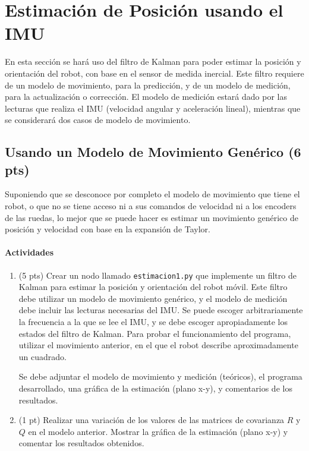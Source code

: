 \documentclass[a4paper,11pt]{robotlabs}
\begin{document}
\section{Estimación de Posición usando el IMU}

En esta sección se hará uso del filtro de Kalman para poder estimar la posición
y orientación del robot, con base en el sensor de medida inercial. Este filtro
requiere de un modelo de movimiento, para la predicción, y de un modelo de
medición, para la actualización o corrección. El modelo de medición estará dado
por las lecturas que realiza el IMU (velocidad angular y aceleración lineal),
mientras que se considerará dos casos de modelo de movimiento.

\subsection{Usando un Modelo de Movimiento Genérico (6 pts)}

Suponiendo que se desconoce por completo el modelo de movimiento que tiene el
robot, o que no se tiene acceso ni a sus comandos de velocidad ni a los
encoders de las ruedas, lo mejor que se puede hacer es estimar un movimiento
genérico de posición y velocidad con base en la expansión de Taylor.

\paragraph{Actividades} 

\begin{enumerate}
\item (5 pts) Crear un nodo llamado \texttt{estimacion1.py} que implemente un
  filtro de Kalman para estimar la posición y orientación del robot móvil. Este
  filtro debe utilizar un modelo de movimiento genérico, y el modelo de
  medición debe incluir las lecturas necesarias del IMU. Se puede escoger
  arbitrariamente la frecuencia a la que se lee el IMU, y se debe escoger
  apropiadamente los estados del filtro de Kalman. Para probar el
  funcionamiento del programa, utilizar el movimiento anterior, en el que el
  robot describe aproximadamente un cuadrado.

  Se debe adjuntar el modelo de movimiento y medición (teóricos), el programa
  desarrollado, una gráfica de la estimación (plano x-y), y comentarios de los
  resultados.

\item (1 pt) Realizar una variación de los valores de las matrices de
  covarianza $R$ y $Q$ en el modelo anterior. Mostrar la gráfica de la
  estimación (plano x-y) y comentar los resultados obtenidos.
  
\end{enumerate}
\end{document}
